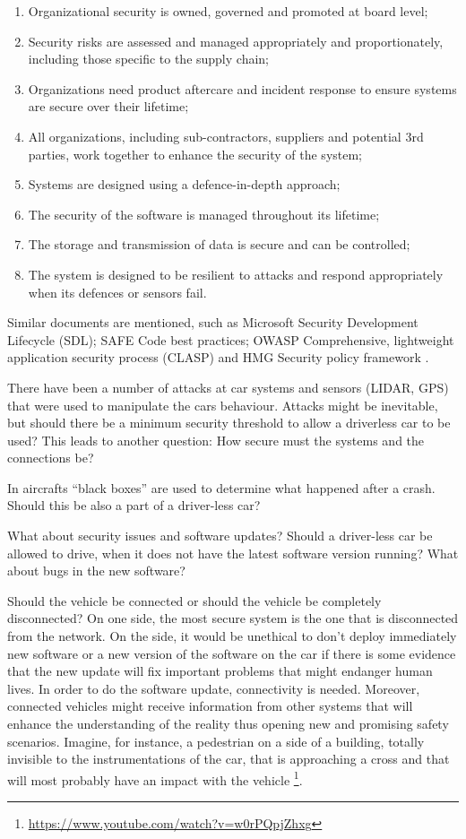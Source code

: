\begin{enumerate}
\item Organizational security is owned, governed and promoted at board level;
\item Security risks are assessed and managed appropriately and proportionately, including those specific to the supply chain;
\item Organizations need product aftercare and incident response to ensure systems are secure over their lifetime;
\item All organizations, including sub-contractors, suppliers and potential 3rd parties, work together to enhance the security of the system;
\item Systems are designed using a defence-in-depth approach;
\item The security of the software is managed throughout its lifetime;
\item The storage and transmission of data is secure and can be controlled;
\item The system is designed to be resilient to attacks and respond appropriately when its defences or sensors fail.
\end{enumerate}

Similar documents are mentioned, such as Microsoft Security Development Lifecycle (SDL); SAFE Code best practices; OWASP Comprehensive, lightweight application security process (CLASP) and HMG Security policy framework \cite{DepartmentforTransportDfT2017}.

There have been a number of attacks at car systems and sensors (LIDAR, GPS) that were used to manipulate the cars behaviour. Attacks might be inevitable, but should there be a minimum security threshold to allow a driverless car to be used? This leads to another question: How secure must the systems and the connections be? 

In aircrafts \enquote{black boxes} are used to determine what happened after a crash. Should this be also a part of a driver-less car? 

What about security issues and software updates? Should a driver-less car be allowed to drive, when it does not have the latest software version running? What about bugs in the new software?

Should the vehicle be connected or should the vehicle be completely disconnected? On one side, the most secure system is the one that is disconnected from the network. On the side, it would be unethical to don’t deploy immediately new software or a new version of the software on the car if there is some evidence that the new update will fix important problems that might endanger human lives. In order to do the software update, connectivity is needed. Moreover, connected vehicles might receive information from other systems that will enhance the understanding of the reality thus opening new and promising safety scenarios. Imagine, for instance, a pedestrian on a side of a building, totally invisible to the instrumentations of the car, that is approaching a cross and that will most probably have an impact with the vehicle \footnote{\url{https://www.youtube.com/watch?v=w0rPQpjZhxg}}. 


